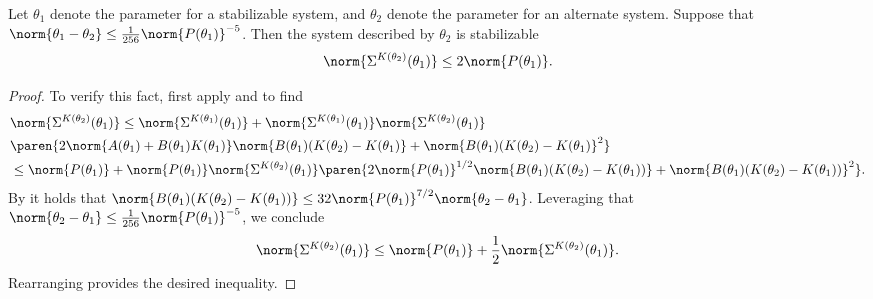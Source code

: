 \begin{lemma}
    \label{lem: CE stabilization}
    Let $\theta_1$ denote the parameter for a stabilizable system, and $\theta_2$ denote the parameter for an alternate system. Suppose that $\norm{\theta_1-\theta_2} \leq \frac{1}{256} \norm{P(\theta_1)}^{-5}$. Then the system described by $\theta_2$ is stabilizable
    \begin{align*}
        \norm{\Sigma^{K(\theta_2)}(\theta_1)} \leq 2 \norm{P(\theta_1)}. 
    \end{align*}
\end{lemma}
\begin{proof}
    To verify this fact, first apply
  and  to find
 \begin{align*}
    & \norm{\Sigma^{K(\theta_2)}(\theta_1)} \leq  \norm{\Sigma^{K(\theta_1)}(\theta_1)} + \norm{\Sigma^{K(\theta_1)}(\theta_1)}\norm{\Sigma^{K(\theta_2)}(\theta_1)} \\
    & \paren{2\norm{A(\theta_1) + B(\theta_1) K(\theta_1)} \norm{B(\theta_1) (K(\theta_2)-K(\theta_1)} + \norm{B(\theta_1) (K(\theta_2)-K(\theta_1)}^2  } \\
    &\leq \norm{P(\theta_1)} + \norm{P(\theta_1)} \norm{\Sigma^{K(\theta_2)}(\theta_1)} \paren{2 \norm{P(\theta_1)}^{1/2} \norm{B(\theta_1)(K(\theta_2)  - K(\theta_1))} +\norm{B(\theta_1)(K(\theta_2)  - K(\theta_1))}^2}.
 \end{align*}
 By  it holds that $\norm{B(\theta_1) (K(\theta_2) - K(\theta_1))} \leq  32 \norm{P(\theta_1)}^{7/2} \norm{\theta_2 - \theta_1}$. Leveraging that $\norm{\theta_2 - \theta_1}\leq\frac{1}{256} \norm{P(\theta_1)}^{-5}$, we conclude 
 \begin{align*}
     \norm{\Sigma^{K(\theta_2)}(\theta_1)} \leq \norm{P(\theta_1)} + \frac{1}{2}\norm{\Sigma^{K(\theta_2)}(\theta_1)}.
 \end{align*}
 Rearranging provides the desired inequality. 
 \end{proof}



